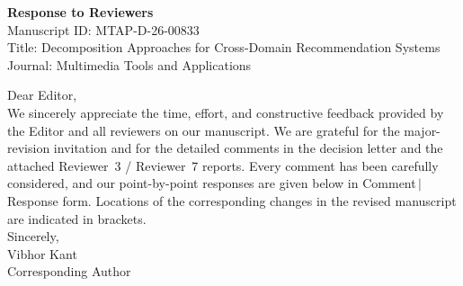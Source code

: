 \documentclass[11pt,a4paper]{article}
\begin{document}
\begin{center}
{\Large\bfseries Response to Reviewers}\\[0.4em]
Manuscript ID: MTAP-D-26-00833\\
Title: Decomposition Approaches for Cross-Domain Recommendation Systems\\
Journal: Multimedia Tools and Applications
\end{center}

\vspace{0.5em}
\noindent Dear Editor,\\[0.3em]
We sincerely appreciate the time, effort, and constructive feedback provided by the Editor and all reviewers on our manuscript. We are grateful for the major-revision invitation and for the detailed comments in the decision letter and the attached Reviewer~3 / Reviewer~7 reports. Every comment has been carefully considered, and our point-by-point responses are given below in Comment\,$\mid$\,Response form. Locations of the corresponding changes in the revised manuscript are indicated in brackets.\\[0.35em]
Sincerely,\\
Vibhor Kant\\
Corresponding Author

\newcommand{\resphead}{%
\rowcolor{headergray}
\textbf{Comment} & \textbf{Response} \\
\midrule
}

\end{document}
